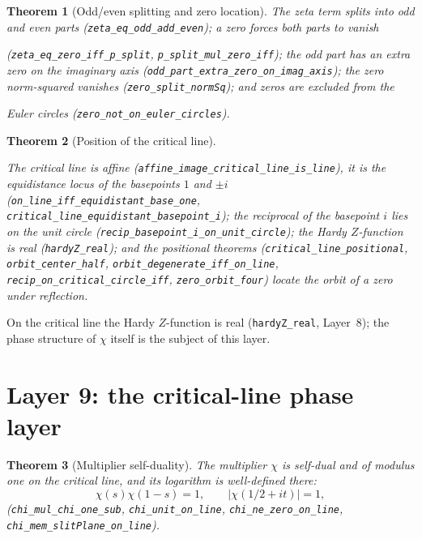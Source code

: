 \documentclass{article}
\newtheorem{theorem}{Theorem}[section]
\newcommand{\Xchi}{\chi}
\begin{document}
\begin{theorem}[Odd/even splitting and zero location]
\label{thm:split}
The zeta term splits into odd and even parts
(\texttt{zeta\_eq\_odd\_add\_even}); a zero forces both parts to vanish
\begin{sloppypar}(\texttt{zeta\_eq\_zero\_iff\_p\_split}, \texttt{p\_split\_mul\_zero\_iff});
the odd part has an extra zero on the imaginary axis
(\texttt{odd\_part\_extra\_zero\_on\_imag\_axis}); the zero norm-squared
vanishes (\texttt{zero\_split\_normSq}); and zeros are excluded from the\end{sloppypar}
Euler circles (\texttt{zero\_not\_on\_euler\_circles}).
\end{theorem}

\begin{theorem}[Position of the critical line]
\label{thm:position}
\begin{sloppypar}The critical line is affine
(\texttt{affine\_image\_critical\_line\_is\_line}),
it is the equidistance locus of the basepoints $1$ and $\pm i$
(\texttt{on\_line\_iff\_equidistant\_base\_one},
\texttt{critical\_line\_equidistant\_basepoint\_i}); the reciprocal of the
basepoint $i$ lies on the unit circle
(\texttt{recip\_basepoint\_i\_on\_unit\_circle}); the Hardy $Z$-function is
real (\texttt{hardyZ\_real}); and the positional theorems
(\texttt{critical\_line\_positional}, \texttt{orbit\_center\_half},
\texttt{orbit\_degenerate\_iff\_on\_line},
\texttt{recip\_on\_critical\_circle\_iff}, \texttt{zero\_orbit\_four})
locate the orbit of a zero under reflection.\end{sloppypar}
\end{theorem}

On the critical line the Hardy $Z$-function is real
(\texttt{hardyZ\_real}, Layer~8); the phase structure of $\Xchi$ itself
is the subject of this layer.

\section{Layer 9: the critical-line phase layer}
\label{sec:L9}

\begin{theorem}[Multiplier self-duality]
\label{thm:chidual}
The multiplier $\Xchi$ is self-dual and of modulus one on the critical
line, and its logarithm is well-defined there:
\[
\Xchi(s)\Xchi(1-s)=1,\qquad |\Xchi(1/2+it)|=1,
\]
(\texttt{chi\_mul\_chi\_one\_sub}, \texttt{chi\_unit\_on\_line},
\texttt{chi\_ne\_zero\_on\_line}, \texttt{chi\_mem\_slitPlane\_on\_line}).
\end{theorem}
\end{document}
